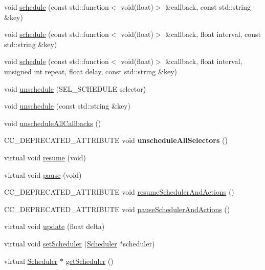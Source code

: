 \begin{Indent}
\begin{DoxyCompactItemize}
void \hyperlink{classNode_a30934785a4592d0704ce952e47f69664}{schedule} (const std\+::function$<$ void(float)$>$ \&callback, const std\+::string \&key)
\item 
void \hyperlink{classNode_ac48adc693c721c34a98357c088f2d97a}{schedule} (const std\+::function$<$ void(float)$>$ \&callback, float interval, const std\+::string \&key)
\item 
void \hyperlink{classNode_ac771b98b6729cc3845fd95cc74c3ae41}{schedule} (const std\+::function$<$ void(float)$>$ \&callback, float interval, unsigned int repeat, float delay, const std\+::string \&key)
\item 
void \hyperlink{classNode_a04fd599a10f38d31fa0c07bfda6cc90c}{unschedule} (S\+E\+L\+\_\+\+S\+C\+H\+E\+D\+U\+LE selector)
\item 
void \hyperlink{classNode_ad7864aa1e9a8391007eca370628d3ce7}{unschedule} (const std\+::string \&key)
\item 
void \hyperlink{classNode_ab8711d9b97d8b944a95c4227c7e9869f}{unschedule\+All\+Callbacks} ()
\item 
\mbox{\label{classNode_a11bc90abb2fd9e8211abcdb2de9d1f76}} 
C\+C\+\_\+\+D\+E\+P\+R\+E\+C\+A\+T\+E\+D\+\_\+\+A\+T\+T\+R\+I\+B\+U\+TE void {\bfseries unschedule\+All\+Selectors} ()
\item 
virtual void \hyperlink{classNode_a7db2011610576bcba564fcf1f47c2e64}{resume} (void)
\item 
virtual void \hyperlink{classNode_a1076a4b9c753597c2c719c27d629d855}{pause} (void)
\item 
C\+C\+\_\+\+D\+E\+P\+R\+E\+C\+A\+T\+E\+D\+\_\+\+A\+T\+T\+R\+I\+B\+U\+TE void \hyperlink{classNode_add0904e6d8d94df6c5dddc26c230cf4c}{resume\+Scheduler\+And\+Actions} ()
\item 
C\+C\+\_\+\+D\+E\+P\+R\+E\+C\+A\+T\+E\+D\+\_\+\+A\+T\+T\+R\+I\+B\+U\+TE void \hyperlink{classNode_abda89d75f7614e3b7c3d17788a61813b}{pause\+Scheduler\+And\+Actions} ()
\item 
virtual void \hyperlink{classNode_a32878481ba54b3856ab53c10af13848e}{update} (float delta)
\item 
virtual void \hyperlink{classNode_a06d543a8e7750e30ba3d1efe0de336de}{set\+Scheduler} (\hyperlink{classScheduler}{Scheduler} $\ast$scheduler)
\item 
virtual \hyperlink{classScheduler}{Scheduler} $\ast$ \hyperlink{classNode_a5d438ab0f04dfa3af9a72ae608478264}{get\+Scheduler} ()
\item 
\mbox{\label{classNode_a57abd1306ae11bd89f2c38bf7e6a4082}} 

\end{DoxyCompactItemize}
\end{Indent}
